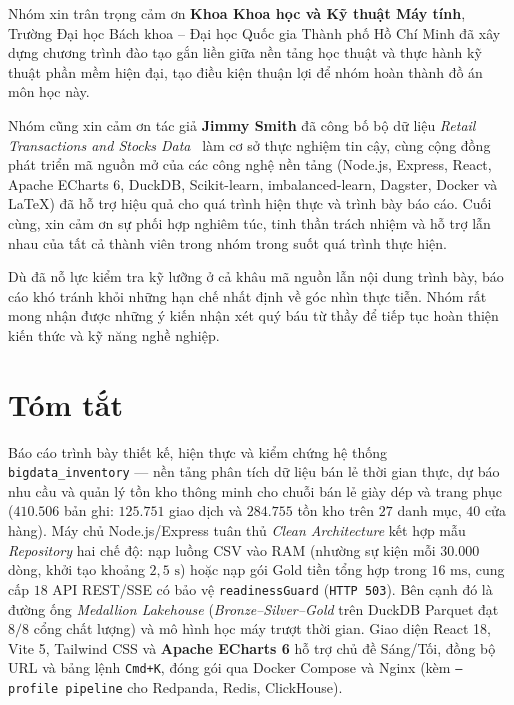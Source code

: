\medskip

Nhóm xin trân trọng cảm ơn \textbf{Khoa Khoa học và Kỹ thuật Máy tính}, Trường Đại học Bách khoa -- Đại học Quốc gia Thành phố Hồ Chí Minh đã xây dựng chương trình đào tạo gắn liền giữa nền tảng học thuật và thực hành kỹ thuật phần mềm hiện đại, tạo điều kiện thuận lợi để nhóm hoàn thành đồ án môn học này.

\medskip

Nhóm cũng xin cảm ơn tác giả \textbf{Jimmy Smith} đã công bố bộ dữ liệu \textit{Retail Transactions and Stocks Data}~\cite{smith2026retail} làm cơ sở thực nghiệm tin cậy, cùng cộng đồng phát triển mã nguồn mở của các công nghệ nền tảng (Node.js, Express, React, Apache ECharts 6, DuckDB, Scikit-learn, imbalanced-learn, Dagster, Docker và \LaTeX) đã hỗ trợ hiệu quả cho quá trình hiện thực và trình bày báo cáo. Cuối cùng, xin cảm ơn sự phối hợp nghiêm túc, tinh thần trách nhiệm và hỗ trợ lẫn nhau của tất cả thành viên trong nhóm trong suốt quá trình thực hiện.

\medskip

Dù đã nỗ lực kiểm tra kỹ lưỡng ở cả khâu mã nguồn lẫn nội dung trình bày, báo cáo khó tránh khỏi những hạn chế nhất định về góc nhìn thực tiễn. Nhóm rất mong nhận được những ý kiến nhận xét quý báu từ thầy để tiếp tục hoàn thiện kiến thức và kỹ năng nghề nghiệp.

\newpage\part*{Tóm tắt}
Báo cáo trình bày thiết kế, hiện thực và kiểm chứng hệ thống \texttt{bigdata_inventory} --- nền tảng phân tích dữ liệu bán lẻ thời gian thực, dự báo nhu cầu và quản lý tồn kho thông minh cho chuỗi bán lẻ giày dép và trang phục ($410.506$ bản ghi: $125.751$ giao dịch và $284.755$ tồn kho trên $27$ danh mục, $40$ cửa hàng). Máy chủ Node.js/Express tuân thủ \textit{Clean Architecture} kết hợp mẫu \textit{Repository} hai chế độ: nạp luồng CSV vào RAM (nhường sự kiện mỗi $30.000$ dòng, khởi tạo khoảng $2{,}5\text{ s}$) hoặc nạp gói Gold tiền tổng hợp trong $16\text{ ms}$, cung cấp $18$ API REST/SSE có bảo vệ \texttt{readinessGuard} (\texttt{HTTP 503}). Bên cạnh đó là đường ống \textit{Medallion Lakehouse} (\textit{Bronze--Silver--Gold} trên DuckDB Parquet đạt $8/8$ cổng chất lượng) và mô hình học máy trượt thời gian. Giao diện React 18, Vite 5, Tailwind CSS và \textbf{Apache ECharts 6} hỗ trợ chủ đề Sáng/Tối, đồng bộ URL và bảng lệnh \texttt{Cmd+K}, đóng gói qua Docker Compose và Nginx (kèm \texttt{--profile pipeline} cho Redpanda, Redis, ClickHouse).

